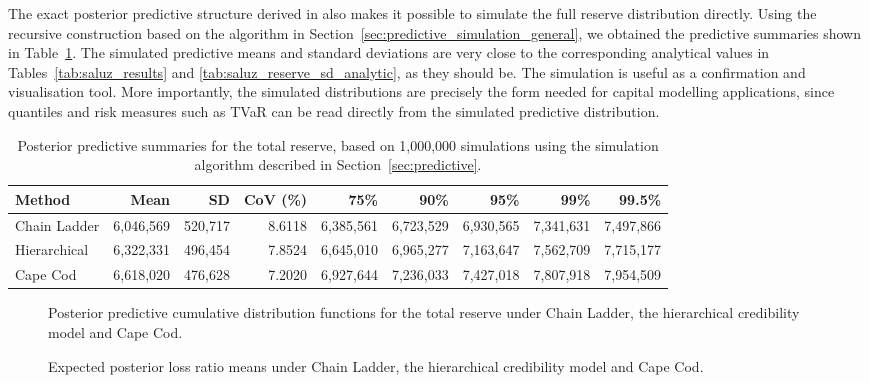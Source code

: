 \documentclass[11pt]{article}
\newcommand{\1}{\mathbf{1}}
\begin{document}
The exact posterior predictive structure derived in  also makes it possible to simulate the full reserve distribution directly. 
Using the recursive construction based on the algorithm in Section~\ref{sec:predictive_simulation_general}, we obtained the predictive summaries shown in Table~\ref{tab:saluz_predictive_summary}. The simulated predictive means and standard deviations are very close to the corresponding analytical values in Tables~\ref{tab:saluz_results} 
and \ref{tab:saluz_reserve_sd_analytic}, as they should be. The simulation is useful as a confirmation and visualisation tool. More importantly, the simulated distributions are precisely the form needed for capital modelling applications, 
since quantiles and risk measures such as TVaR can be read directly from the simulated predictive distribution.

\begin{table}[htbp]
\centering
\setlength{\tabcolsep}{2pt}
\begin{tabular}{lrrrrrrrr}
\toprule
Method & Mean & SD & CoV (\%)& 75\% & 90\% & 95\% & 99\% & 99.5\% \\
\midrule
Chain Ladder & 6,046,569 & 520,717 & 8.6118 & 6,385,561 & 6,723,529 & 6,930,565 & 7,341,631 & 7,497,866 \\
Hierarchical & 6,322,331 & 496,454 & 7.8524 & 6,645,010 & 6,965,277 & 7,163,647 & 7,562,709 & 7,715,177 \\
Cape Cod & 6,618,020 & 476,628 & 7.2020 & 6,927,644 & 7,236,033 & 7,427,018 & 7,807,918 & 7,954,509 \\
\bottomrule
\end{tabular}
\caption{Posterior predictive summaries for the total reserve, based on 1,000,000 simulations using the simulation algorithm described in Section~\ref{sec:predictive}.}
\label{tab:saluz_predictive_summary}
\end{table}


\begin{figure}[htbp]
\centering
{}
\caption{Posterior predictive cumulative distribution functions for the total reserve under Chain Ladder, the hierarchical credibility model and Cape Cod.}
\label{fig:saluz_predictive_cdf}
\end{figure}


\begin{figure}[htbp]
\centering
{}
\caption{Expected posterior loss ratio means under Chain Ladder, the hierarchical credibility model and Cape Cod.}
\label{fig:saluz_lr_means}
\end{figure}
\end{document}
